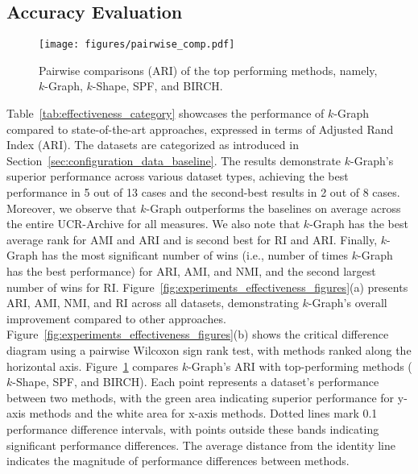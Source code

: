 \subsection{Accuracy Evaluation}

\begin{figure}[tb]
 \centering
\texttt{[image: figures/pairwise\_comp.pdf]}

 \caption{Pairwise comparisons (ARI) of the top performing methods, namely, $k$-Graph, $k$-Shape, SPF, and BIRCH.}
\vspace{-0.3cm}
 \label{fig:pairwise_comp}
\end{figure}


 Table~\ref{tab:effectiveness_category} showcases the performance of $k$-Graph compared to state-of-the-art approaches, expressed in terms of Adjusted Rand Index (ARI). The datasets are categorized as introduced in Section~\ref{sec:configuration_data_baseline}.
The results demonstrate $k$-Graph's superior performance across various dataset types, achieving the best performance in 5 out of 13 cases and the second-best results in 2 out of 8 cases. 
Moreover, we observe that $k$-Graph outperforms the baselines on average across the entire UCR-Archive for all measures. We also note that $k$-Graph has the best average rank for AMI and ARI and is second best for RI and ARI. Finally, $k$-Graph has the most significant number of wins (i.e., number of times $k$-Graph has the best performance) for ARI, AMI, and NMI, and the second largest number of wins for RI. Figure~\ref{fig:experiments_effectiveness_figures}(a) presents ARI, AMI, NMI, and RI across all datasets, demonstrating $k$-Graph's overall improvement compared to other approaches. Figure~\ref{fig:experiments_effectiveness_figures}(b) shows the critical difference diagram using a pairwise Wilcoxon sign rank test, with methods ranked along the horizontal axis.
Figure~\ref{fig:pairwise_comp} compares $k$-Graph's ARI with top-performing methods ($k$-Shape, SPF, and BIRCH). Each point represents a dataset's performance between two methods, with the green area indicating superior performance for y-axis methods and the white area for x-axis methods. Dotted lines mark 0.1 performance difference intervals, with points outside these bands indicating significant performance differences. The average distance from the identity line indicates the magnitude of performance differences between methods.



